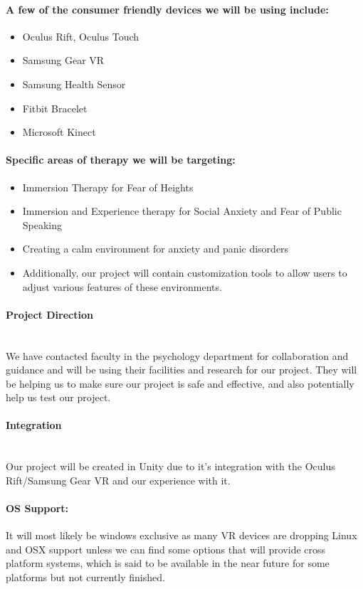 \documentclass[a4paper,10pt]{article}
\begin{document}
	\paragraph{A few of the consumer friendly devices we will be using include:}
	\begin{itemize}
		\item Oculus Rift, Oculus Touch
		\item Samsung Gear VR
		\item Samsung Health Sensor
		\item Fitbit Bracelet
		\item Microsoft Kinect
	\end{itemize}
	
	\paragraph{Specific areas of therapy we will be targeting:}
	\begin{itemize}
		\item Immersion Therapy for Fear of Heights
		\item Immersion and Experience therapy for Social Anxiety and Fear of Public Speaking
		\item Creating a calm environment for anxiety and panic disorders
		\item Additionally, our project will contain customization tools to allow users to adjust various features of these environments.
	\end{itemize}
	
	
	\paragraph{Project Direction} ~\\ We have contacted faculty in the psychology department for collaboration and guidance and will be using their facilities and research for our project.  They will be helping us to make sure our project is safe and effective, and also potentially help us test our project.
	\paragraph{Integration} ~\\ Our project will be created in Unity due to it's integration with the Oculus Rift/Samsung Gear VR and our experience with it.
	\paragraph{OS Support:}It will most likely be windows exclusive as many VR devices are dropping Linux and OSX support unless we can find some options that will provide cross platform systems, which is said to be available in the near future for some platforms but not currently finished.  
	
\end{document}
